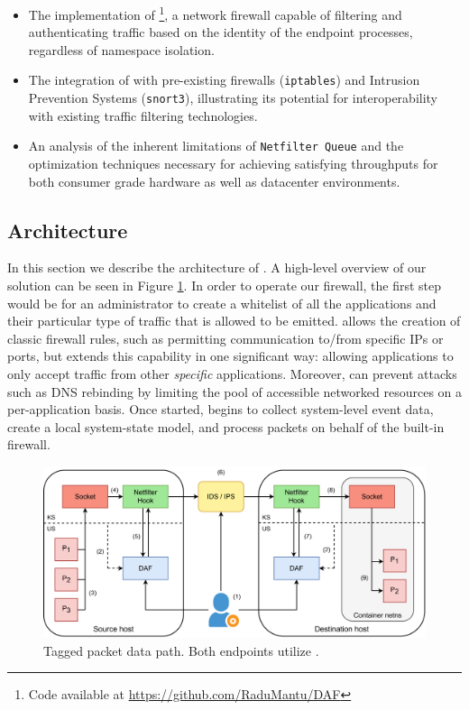 \begin{itemize}
    \item The implementation of \daf{} \footnote{Code available at \url{https://github.com/RaduMantu/DAF}}, a network firewall capable of filtering and authenticating traffic based on the identity of the endpoint processes, regardless of namespace isolation.

    \item The integration of \daf{} with pre-existing firewalls (\texttt{iptables}) and Intrusion Prevention Systems (\texttt{snort3}), illustrating its potential for interoperability with existing traffic filtering technologies.

    \item An analysis of the inherent limitations of \texttt{Netfilter Queue} and the optimization techniques necessary for achieving satisfying throughputs for both consumer grade hardware as well as datacenter environments.
\end{itemize}

\subsection{Architecture}
\label{apffw:daf:architecture}

In this section we describe the architecture of \daf{}. A high-level overview of our solution can be seen in Figure \ref{appfw:daf:fig:sys-architecture}. In order to operate our firewall, the first step would be for an administrator to create a whitelist of all the applications and their particular type of traffic that is allowed to be emitted. \daf{} allows the creation of classic firewall rules, such as permitting communication to/from specific IPs or ports, but extends this capability in one significant way: allowing applications to only accept traffic from other \textit{specific} applications. Moreover, \daf{} can prevent attacks such as DNS rebinding by limiting the pool of accessible networked resources on a per-application basis. Once started, \daf{} begins to collect system-level event data, create a local system-state model, and process packets on behalf of the built-in firewall.

\begin{figure}[h]
    \centering
    \includegraphics[width=\textwidth,keepaspectratio]{figures/daf-sys-architecture.pdf}
    \caption{Tagged packet data path. Both endpoints utilize \daf{}.}
    \label{appfw:daf:fig:sys-architecture}
\end{figure}

